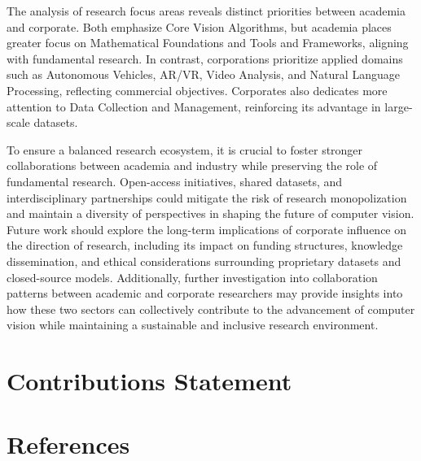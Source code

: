 \documentclass{article}
\begin{document}
The analysis of research focus areas reveals distinct priorities between academia and corporate. Both emphasize Core Vision Algorithms, but academia places greater focus on Mathematical Foundations and Tools and Frameworks, aligning with fundamental research. In contrast, corporations prioritize applied domains such as Autonomous Vehicles, AR/VR, Video Analysis, and Natural Language Processing, reflecting commercial objectives. Corporates also dedicates more attention to Data Collection and Management, reinforcing its advantage in large-scale datasets.

To ensure a balanced research ecosystem, it is crucial to foster stronger collaborations between academia and industry while preserving the role of fundamental research. Open-access initiatives, shared datasets, and interdisciplinary partnerships could mitigate the risk of research monopolization and maintain a diversity of perspectives in shaping the future of computer vision. Future work should explore the long-term implications of corporate influence on the direction of research, including its impact on funding structures, knowledge dissemination, and ethical considerations surrounding proprietary datasets and closed-source models. Additionally, further investigation into collaboration patterns between academic and corporate researchers may provide insights into how these two sectors can collectively contribute to the advancement of computer vision while maintaining a sustainable and inclusive research environment.
\section{Contributions Statement}



\section*{References}
\end{document}
